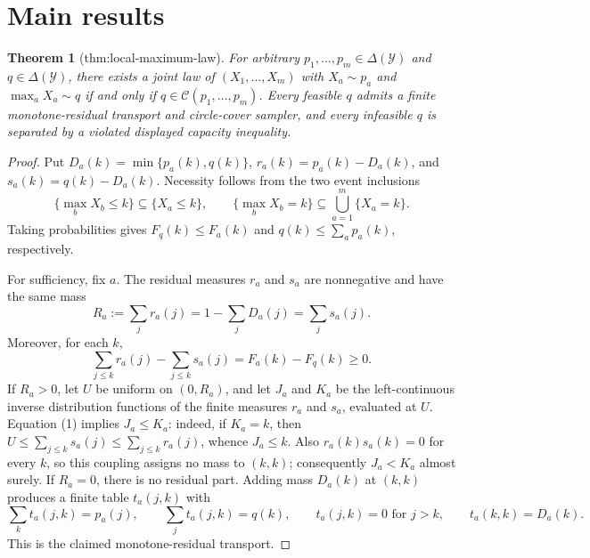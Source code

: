 \documentclass{article}
\newtheorem{theorem}{Theorem}
\begin{document}
\section{Main results}

\begin{theorem}[thm:local-maximum-law]\label{thm:local-maximum-law}
For arbitrary \(p_1,\ldots,p_m\in\Delta(\mathcal Y)\) and \(q\in\Delta(\mathcal Y)\), there exists a joint law of \((X_1,\ldots,X_m)\) with \(X_a\sim p_a\) and \(\max_a X_a\sim q\) if and only if \(q\in\mathcal C(p_1,\ldots,p_m)\). Every feasible \(q\) admits a finite monotone-residual transport and circle-cover sampler, and every infeasible \(q\) is separated by a violated displayed capacity inequality.
\end{theorem}
\begin{proof}
Put \(D_a(k)=\min\{p_a(k),q(k)\}\), \(r_a(k)=p_a(k)-D_a(k)\), and \(s_a(k)=q(k)-D_a(k)\).  Necessity follows from the two event inclusions
\[
 \{\max_bX_b\leq k\}\subseteq\{X_a\leq k\},
 \qquad
 \{\max_bX_b=k\}\subseteq\bigcup_{a=1}^m\{X_a=k\}.
\]
Taking probabilities gives \(F_q(k)\leq F_a(k)\) and \(q(k)\leq\sum_a p_a(k)\), respectively.

For sufficiency, fix \(a\).  The residual measures \(r_a\) and \(s_a\) are nonnegative and have the same mass
\[
 R_a:=\sum_jr_a(j)=1-\sum_jD_a(j)=\sum_js_a(j).
\]
Moreover, for each \(k\),
\[
 \sum_{j\leq k}r_a(j)-\sum_{j\leq k}s_a(j)
 =F_a(k)-F_q(k)\geq0.                                      \tag{1}
\]
If \(R_a>0\), let \(U\) be uniform on \((0,R_a)\), and let \(J_a\) and \(K_a\) be the left-continuous inverse distribution functions of the finite measures \(r_a\) and \(s_a\), evaluated at \(U\).  Equation (1) implies \(J_a\leq K_a\): indeed, if \(K_a=k\), then \(U\leq\sum_{j\leq k}s_a(j)\leq\sum_{j\leq k}r_a(j)\), whence \(J_a\leq k\).  Also \(r_a(k)s_a(k)=0\) for every \(k\), so this coupling assigns no mass to \((k,k)\); consequently \(J_a<K_a\) almost surely.  If \(R_a=0\), there is no residual part.  Adding mass \(D_a(k)\) at \((k,k)\) produces a finite table \(t_a(j,k)\) with
\[
 \sum_kt_a(j,k)=p_a(j),\qquad
 \sum_jt_a(j,k)=q(k),\qquad
 t_a(j,k)=0\text{ for }j>k,
 \qquad t_a(k,k)=D_a(k).                                  \tag{2}
\]
This is the claimed monotone-residual transport.


\end{proof}
\end{document}
